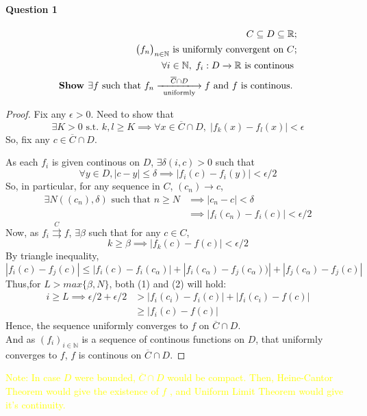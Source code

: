 \documentclass[20pt,a4paper]{extarticle} %
\begin{document}
\paragraph{Question 1} %
\begin{eqnarray*}
	C \subseteq D \subseteq \mathbb{R};\\
	\big(f _n\big)_{n \in \mathbb{N}} \text{ is uniformly convergent on } C ;\\
	\forall i \in \mathbb{N} , \; f_i : D \xrightarrow{} \mathbb{R} \text{ is continous }\\
	\textbf{Show } \exists f \text{ such that } f_n \xlongrightarrow [ \text{ uniformly }]{ \overline{C} \cap D } f
	\text{ and } f \text{ is continous. }
\end{eqnarray*}
\begin{proof}

	Fix any $\epsilon > 0$. Need to show that
	\[ \exists K >0 \text{ s.t. } k,l\geq K \implies \forall x \in \overline{C} \cap D, \;
	|f_k(x) - f_l(x) |< \epsilon\]
	So, fix any $c \in \overline{C} \cap D$.

	As each $f_i$ is given continous on $D$, $\exists \delta(i,c) >0 $ such that
	\[ \forall y \in D, |c-y| \leq \delta \implies |f_i(c) - f_i(y)| < \epsilon/2 \]
	So, in particular, for any sequence in $C$, $(c_n) \rightarrow c$,
	\begin{align*}
		\exists N((c_n),\delta) \text{ such that }
		n\geq N & \implies |c_n - c| < \delta \\
		& \implies |f_i(c_n) - f_i(c)| < \epsilon/2
	\end{align*}
	Now, as $f_i \overset{C}{\rightrightarrows} f$, $\exists \beta$ such that
	for any $c \in C$,
	\begin{equation*}
		k \geq \beta \implies |f_k(c) - f(c)| < \epsilon/2
	\end{equation*}
	By triangle inequality,
	\[ |f_i(c) - f_j(c)| \leq |f_i(c) - f_i(c_\alpha)| + |f_i(c_\alpha) - f_j(c_\alpha))|+|f_j(c_\alpha) - f_j(c)|\]
	Thus,for $L > max\{ \beta , N \}$, both (1) and (2) will hold:
	\begin{align*}
		i \geq L \implies \epsilon/2 +\epsilon/2 &> |f_i(c_i) - f_i(c)|+ |f_i(c_i) - f(c)| \\
							 &\geq |f_i(c) - f(c) |
	\end{align*}
	Hence, the sequence uniformly converges to $f$ on $\overline{C}\cap D$.\\
	And as $(f_i)_{i \in \mathbb{N}}$ is a sequence of continous functions on $D$, that uniformly converges to $f$,
	$f$ is continous on $\overline{C}\cap D$.
\end{proof}
\textcolor{yellow}{Note: In case $D$ were bounded, $\overline{C} \cap D $ would be compact. Then, Heine-Cantor Theorem would give the existence of $f$ , and Uniform Limit Theorem would give it's continuity.   }
\end{document}
